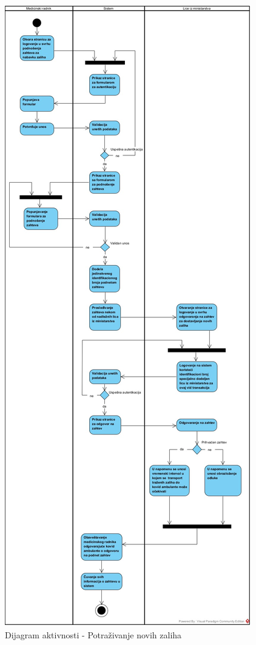 \documentclass[titlepage]{article}
\begin{document}
\begin{figure}[H]
\centering
\includegraphics[scale=0.3]{Potrazivanje_novih_zaliha}
\caption{Dijagram aktivnosti -  Potraživanje novih zaliha}
\end{figure}
\end{document}
